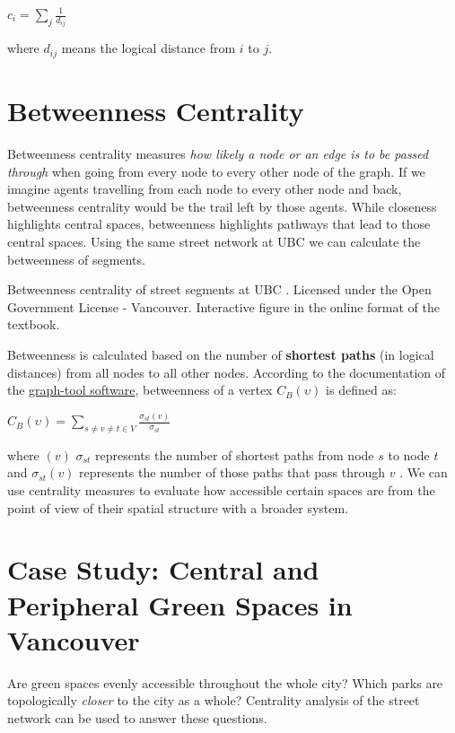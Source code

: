 \documentclass[
]{book}
\begin{document}
\(c_i = \sum\limits_{j} \frac{1}{d_{ij}}\)

where \(d_{ij}\) means the logical distance from \(i\) to \(j\).

\section{Betweenness Centrality}\label{betweenness-centrality}

Betweenness centrality measures \emph{how likely a node or an edge is to be passed through} when going from every node to every other node of the graph. If we imagine agents travelling from each node to every other node and back, betweenness centrality would be the trail left by those agents. While closeness highlights central spaces, betweenness highlights pathways that lead to those central spaces. Using the same street network at UBC we can calculate the betweenness of segments.

\label{fig:8-betweenness-centrality}Betweenness centrality of street segments at UBC \citep{city_of_vancouver_open_nodate}. Licensed under the Open Government License - Vancouver. Interactive figure in the online format of the textbook.

Betweenness is calculated based on the number of \textbf{shortest paths} (in logical distances) from all nodes to all other nodes. According to the documentation of the \href{https://graph-tool.skewed.de/static/doc/centrality.html}{graph-tool software}, betweenness of a vertex \(C_{B}(\upsilon)\) is defined as:

\(C_{B}(\upsilon) = \sum\limits_{s \neq v \neq t \in V} \frac {\sigma_{st}(v)}{\sigma_{st}}\)

where \((v)\) \({\sigma_{st}}\) represents the number of shortest paths from node \(s\) to node \(t\) and \({\sigma_{st}(v)}\) represents the number of those paths that pass through \(v\) \citep{graph-tool_centrality_nodate}. We can use centrality measures to evaluate how accessible certain spaces are from the point of view of their spatial structure with a broader system.

\section{Case Study: Central and Peripheral Green Spaces in Vancouver}\label{case-study-central-and-peripheral-green-spaces-in-vancouver}

Are green spaces evenly accessible throughout the whole city? Which parks are topologically \emph{closer} to the city as a whole? Centrality analysis of the street network can be used to answer these questions.
\end{document}
